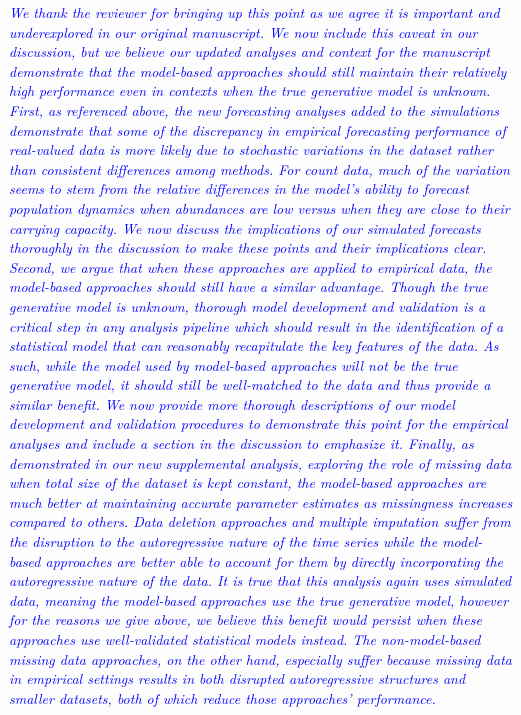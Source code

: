 \documentclass{article}
\begin{document}
\begin{linenumbers}
\noindent \textcolor{blue}{\textit{We thank the reviewer for bringing up this point as we agree it is important and underexplored in our original manuscript. We now include this caveat in our discussion, but we believe our updated analyses and context for the manuscript demonstrate that the model-based approaches should still maintain their relatively high performance even in contexts when the true generative model is unknown. First, as referenced above, the new forecasting analyses added to the simulations demonstrate that some of the discrepancy in empirical forecasting performance of real-valued data is more likely due to stochastic variations in the dataset rather than consistent differences among methods. For count data, much of the variation seems to stem from the relative differences in the model’s ability to forecast population dynamics when abundances are low versus when they are close to their carrying capacity. We now discuss the implications of our simulated forecasts thoroughly in the discussion to make these points and their implications clear. Second, we argue that when these approaches are applied to empirical data, the model-based approaches should still have a similar advantage. Though the true generative model is unknown, thorough model development and validation is a critical step in any analysis pipeline which should result in the identification of a statistical model that can reasonably recapitulate the key features of the data. As such, while the model used by model-based approaches will not be the true generative model, it should still be well-matched to the data and thus provide a similar benefit. We now provide more thorough descriptions of our model development and validation procedures to demonstrate this point for the empirical analyses and include a section in the discussion to emphasize it. Finally, as demonstrated in our new supplemental analysis, exploring the role of missing data when total size of the dataset is kept constant, the model-based approaches are much better at maintaining accurate parameter estimates as missingness increases compared to others. Data deletion approaches and multiple imputation suffer from the disruption to the autoregressive nature of the time series while the model-based approaches are better able to account for them by directly incorporating the autoregressive nature of the data. It is true that this analysis again uses simulated data, meaning the model-based approaches use the true generative model, however for the reasons we give above, we believe this benefit would persist when these approaches use well-validated statistical models instead. The non-model-based missing data approaches, on the other hand, especially suffer because missing data in empirical settings results in both disrupted autoregressive structures and smaller datasets, both of which reduce those approaches' performance.}}


\end{linenumbers}
\end{document}
